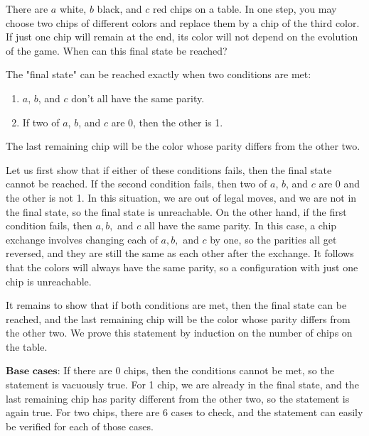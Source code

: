 \begin{problem}
There are $a$ white, $b$ black, and $c$ red chips on a table. In one step, you may choose
two chips of different colors and replace them by a chip of the third color. If just one chip will remain at the end, its color will not depend on the evolution of the game.
When can this final state be reached?
\end{problem}

The "final state" can be reached exactly when two conditions are met:
\begin{enumerate}
  \item $a$, $b$, and $c$ don't all have the same parity.
  \item If two of $a$, $b$, and $c$ are 0, then the other is 1.
\end{enumerate}  
The last remaining chip will be the color whose parity differs from the other two.

Let us first show that if either of these conditions fails, then the final state cannot be reached. If the second condition fails, then two of $a$, $b$, and $c$ are 0 and the other is not 1. In this situation, we are out of legal moves, and we are not in the final state, so the final state is unreachable. On the other hand, if the first condition fails, then $a, b,$ and $c$ all have the same parity. In this case, a chip exchange involves changing each of $a, b,$ and $c$ by one, so the parities all get reversed, and they are still the same as each other after the exchange. It follows that the colors will always have the same parity, so a configuration with just one chip is unreachable.

It remains to show that if both conditions are met, then the final state can be reached, and the last remaining chip will be the color whose parity differs from the other two. We prove this statement by induction on the number of chips on the table. 

$\textbf{Base cases:}$ If there are 0 chips, then the conditions cannot be met, so the statement is vacuously true. For 1 chip, we are already in the final state, and the last remaining chip has parity different from the other two, so the statement is again true. For two chips, there are 6 cases to check, and the statement can easily be verified for each of those cases.

